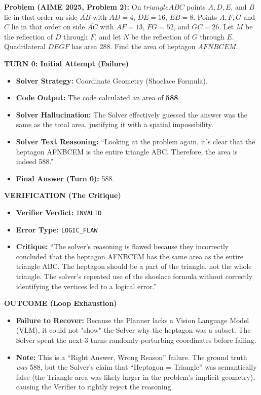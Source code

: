 \documentclass{article}
\begin{document}
\noindent\hrulefill

\textbf{Problem (AIME 2025, Problem 2):} On $triangle ABC$ points $A, D, E$, and $B$ lie in that order on side $\overline{AB}$ with $AD = 4$, $DE = 16$, $EB = 8$. Points $A, F, G$ and $C$ lie in that order on side $\overline{AC}$ with $AF = 13$, $FG = 52$, and $GC = 26$. Let $M$ be the reflection of $D$ through $F$, and let $N$ be the reflection of $G$ through $E$. Quadrilateral $DEGF$ has area $288$. Find the area of heptagon $AFNBCEM$.



\vspace{0.5em}
\textbf{TURN 0: Initial Attempt (Failure)}
\begin{itemize}
    \item \textbf{Solver Strategy:} Coordinate Geometry (Shoelace Formula).
    \item \textbf{Code Output:} The code calculated an area of \textbf{588}.
    \item \textbf{Solver Hallucination:} The Solver effectively guessed the answer was the same as the total area, justifying it with a spatial impossibility.
    \item \textbf{Solver Text Reasoning:} ``Looking at the problem again, it's clear that the heptagon AFNBCEM is the entire triangle ABC. Therefore, the area is indeed 588.''
    \item \textbf{Final Answer (Turn 0):} 588.
\end{itemize}

\vspace{0.5em}
\textbf{VERIFICATION (The Critique)}
\begin{itemize}
    \item \textbf{Verifier Verdict:} \texttt{INVALID}
    \item \textbf{Error Type:} \texttt{LOGIC\_FLAW}
    \item \textbf{Critique:} ``The solver's reasoning is flawed because they incorrectly concluded that the heptagon AFNBCEM has the same area as the entire triangle ABC. The heptagon should be a part of the triangle, not the whole triangle. The solver's repeated use of the shoelace formula without correctly identifying the vertices led to a logical error.''
\end{itemize}

\vspace{0.5em}
\textbf{OUTCOME (Loop Exhaustion)}
\begin{itemize}
    \item \textbf{Failure to Recover:} Because the Planner lacks a Vision Language Model (VLM), it could not "show" the Solver why the heptagon was a subset. The Solver spent the next 3 turns randomly perturbing coordinates before failing.
    \item \textbf{Note:} This is a ``Right Answer, Wrong Reason'' failure. The ground truth \textit{was} 588, but the Solver's claim that ``Heptagon = Triangle'' was semantically false (the Triangle area was likely larger in the problem's implicit geometry), causing the Verifier to rightly reject the reasoning.
\end{itemize}
\end{document}
